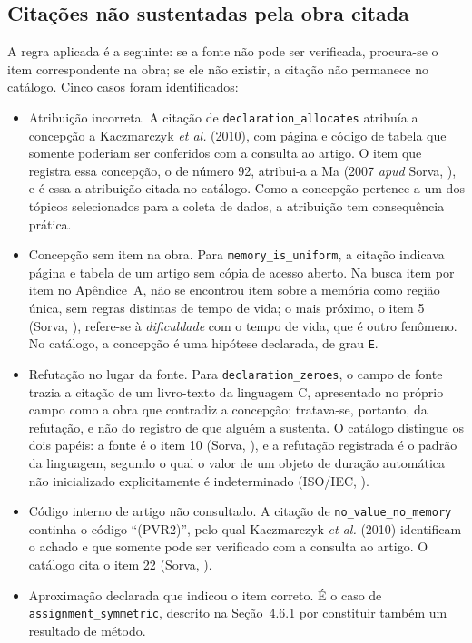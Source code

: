 \subsection{Citações não sustentadas pela obra citada}

A regra aplicada é a seguinte: se a fonte não pode ser verificada, procura-se o item correspondente na obra; se ele não existir, a citação não permanece no catálogo. Cinco casos foram identificados:

\begin{itemize}
\item Atribuição incorreta. A citação de \texttt{declaration\_\allowbreak{}allocates} atribuía a concepção a Kaczmarczyk \textit{et al.} (2010), com página e código de tabela que somente poderiam ser conferidos com a consulta ao artigo. O item que registra essa concepção, o de número 92, atribui-a a Ma (2007 \textit{apud} Sorva, \citeyear{sorva2012}), e é essa a atribuição citada no catálogo. Como a concepção pertence a um dos tópicos selecionados para a coleta de dados, a atribuição tem consequência prática.
\item Concepção sem item na obra. Para \texttt{memory\_\allowbreak{}is\_\allowbreak{}uniform}, a citação indicava página e tabela de um artigo sem cópia de acesso aberto. Na busca item por item no Apêndice~A, não se encontrou item sobre a memória como região única, sem regras distintas de tempo de vida; o mais próximo, o item 5 (Sorva, \citeyear{sorva2012}), refere-se à \textit{dificuldade} com o tempo de vida, que é outro fenômeno. No catálogo, a concepção é uma hipótese declarada, de grau \texttt{E}.
\item Refutação no lugar da fonte. Para \texttt{declaration\_\allowbreak{}zeroes}, o campo de fonte trazia a citação de um livro-texto da linguagem C, apresentado no próprio campo como a obra que contradiz a concepção; tratava-se, portanto, da refutação, e não do registro de que alguém a sustenta. O catálogo distingue os dois papéis: a fonte é o item 10 (Sorva, \citeyear{sorva2012}), e a refutação registrada é o padrão da linguagem, segundo o qual o valor de um objeto de duração automática não inicializado explicitamente é indeterminado (ISO/IEC, \citeyear{isoiec2011}).
\item Código interno de artigo não consultado. A citação de \texttt{no\_\allowbreak{}value\_\allowbreak{}no\_\allowbreak{}memory} continha o código ``(PVR2)'', pelo qual Kaczmarczyk \textit{et al.} (2010) identificam o achado e que somente pode ser verificado com a consulta ao artigo. O catálogo cita o item 22 (Sorva, \citeyear{sorva2012}).
\item Aproximação declarada que indicou o item correto. É o caso de \texttt{assignment\_\allowbreak{}symmetric}, descrito na Seção~4.6.1 por constituir também um resultado de método.
\end{itemize}

